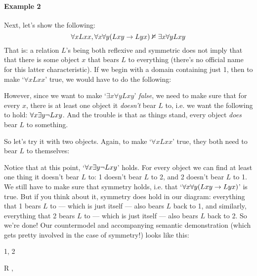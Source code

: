 \paragraph{Example 2} Next, let's show the following:
$$\forall x Lxx, \forall x\forall y(Lxy \rightarrow Lyx) \nvDash \exists x\forall yLxy$$
That is: a relation $L$'s being both reflexive and symmetric does not imply that that there is some object $x$ that bears $L$ to everything (there's no official name for this latter characteristic).  If we begin with a domain containing just 1, then to make `$\forall xLxx$' true, we would have to do the following:
\begin{center}\end{center}
However, since we want to make `$\exists x\forall yLxy$' \emph{false}, we need to make sure that for every $x$, there is at least one object it \emph{doesn't} bear $L$ to, i.e. we want the following to hold: $\forall x \exists y \neg Lxy$.  And the trouble is that as things stand, every object \emph{does} bear $L$ to something.

So let's try it with two objects.  Again, to make `$\forall xLxx$' true, they both need to bear $L$ to themselves:
\begin{center}\end{center}
Notice that at this point, `$\forall x \exists y \neg Lxy$' holds.  For every object we can find at least one thing it doesn't bear $L$ to: 1 doesn't bear $L$ to 2, and 2 doesn't bear $L$ to 1.  We still have to make sure that symmetry holds, i.e. that `$\forall x\forall y(Lxy \rightarrow Lyx)$' is true.  But if you think about it, symmetry does hold in our diagram: everything that 1 bears $L$ to --- which is just itself --- also bears $L$ back to 1, and similarly, everything that 2 bears $L$ to --- which is just itself --- also bears $L$ back to 2.  So we're done!  Our countermodel and accompanying semantic demonstration (which gets pretty involved in the case of symmetry!) looks like this:
\begin{center}
\begin{minipage}{0.8\textwidth}
\begin{multicols}{2}
\begin{ekey}
	\item[\text{Domain}] 1, 2
	\item[R] , 
\end{ekey}
\columnbreak
{}
\end{multicols}\end{minipage}\end{center}


